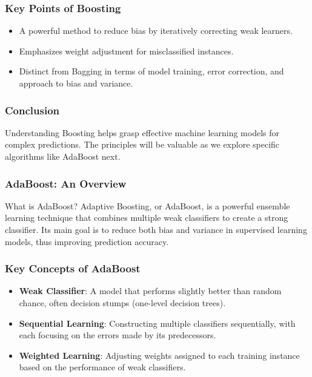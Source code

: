 \documentclass[aspectratio=169]{beamer}
\begin{document}
\begin{frame}[fragile]
  \frametitle{Key Points of Boosting}

  \begin{itemize}
    \item A powerful method to reduce bias by iteratively correcting weak learners.
    \item Emphasizes weight adjustment for misclassified instances.
    \item Distinct from Bagging in terms of model training, error correction, and approach to bias and variance.
  \end{itemize}
\end{frame}

\begin{frame}[fragile]
  \frametitle{Conclusion}

  Understanding Boosting helps grasp effective machine learning models for complex predictions. The principles will be valuable as we explore specific algorithms like AdaBoost next.
\end{frame}

\begin{frame}[fragile]
  \frametitle{AdaBoost: An Overview}
  \begin{block}{What is AdaBoost?}
    Adaptive Boosting, or AdaBoost, is a powerful ensemble learning technique that combines multiple weak classifiers to create a strong classifier. Its main goal is to reduce both bias and variance in supervised learning models, thus improving prediction accuracy.
  \end{block}
\end{frame}

\begin{frame}[fragile]
  \frametitle{Key Concepts of AdaBoost}
  \begin{itemize}
    \item \textbf{Weak Classifier}: A model that performs slightly better than random chance, often decision stumps (one-level decision trees).
    \item \textbf{Sequential Learning}: Constructing multiple classifiers sequentially, with each focusing on the errors made by its predecessors.
    \item \textbf{Weighted Learning}: Adjusting weights assigned to each training instance based on the performance of weak classifiers.
  \end{itemize}
\end{frame}
\end{document}
